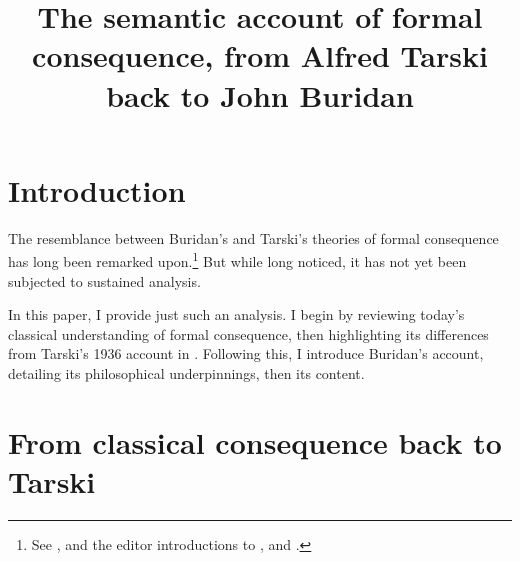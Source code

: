 \documentclass[]{article}
\title{The semantic account of formal consequence, from Alfred Tarski back to John Buridan}
\author{}
\begin{document}
\maketitle

\section{Introduction}
The resemblance between Buridan's and Tarski's theories of formal consequence has long been remarked upon.\footnote{See \cite{Moody1952} \cite{Kneale1962} \cite{Dumitriu1974} \cite{DutilhNovaes2012a} \cite{DutilhNovaes2012c} \cite{Parsons2014}, and the editor introductions to \cite{BuridanTC}, \cite{Kretzmann1982} and \cite{King1985}.} But while long noticed, it has not yet been subjected to sustained analysis.

In this paper, I provide just such an analysis. I begin by reviewing today's classical understanding of formal consequence, then highlighting its differences from Tarski's 1936 account in \cite{Tarski2002}. Following this, I introduce Buridan's account, detailing its philosophical underpinnings, then its content.
\section{From classical consequence back to Tarski}
\end{document}
